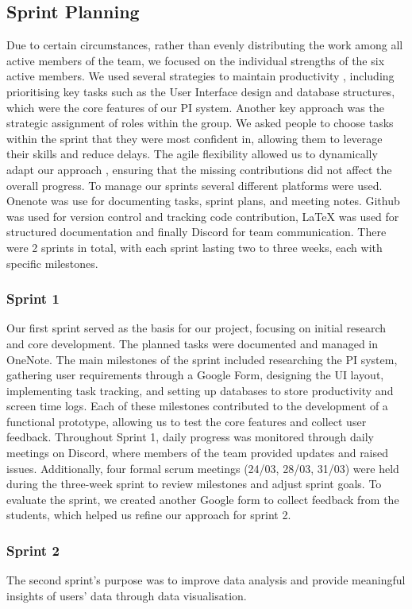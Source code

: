 \documentclass[12pt,a4paper]{article}
\begin{document}
\subsection{Sprint Planning}
Due to certain circumstances, rather than evenly distributing the work among all active members of the team, we focused on the individual strengths of the six active members. We used several strategies to maintain productivity , including prioritising key tasks such as the User Interface design and database structures, which were the core features of our PI system. Another key approach was the strategic assignment of roles within the group. We asked people to choose tasks within the sprint that they were most confident in, allowing them to leverage their skills and reduce delays. The agile flexibility allowed us to dynamically adapt our approach , ensuring that the missing contributions did not affect the overall progress.
To manage our sprints several different platforms were used. Onenote was use for documenting tasks, sprint plans, and meeting notes. Github was used for version control and tracking code contribution, LaTeX was used for structured documentation and finally Discord for team communication. There were 2 sprints in total, with each sprint lasting two to three weeks, each with specific milestones.

\subsubsection{Sprint 1}
Our first sprint served as the basis for our project, focusing on initial research and core development. The planned tasks were documented and managed in OneNote. The main milestones of the sprint included researching the PI system, gathering user requirements through a Google Form, designing the UI layout, implementing task tracking, and setting up databases to store productivity and screen time logs. Each of these milestones contributed to the development of a functional prototype, allowing us to test the core features and collect user feedback. Throughout Sprint 1, daily progress was monitored through daily meetings on Discord, where members of the team provided updates and raised issues. Additionally, four formal scrum meetings (24/03, 28/03, 31/03) were held during the three-week sprint to review milestones and adjust sprint goals. To evaluate the sprint, we created another Google form to collect feedback from the students, which helped us refine our approach for sprint 2.
\subsubsection{Sprint 2}
The second sprint's purpose was to improve data analysis and provide meaningful insights of users' data through data visualisation.
\end{document}
